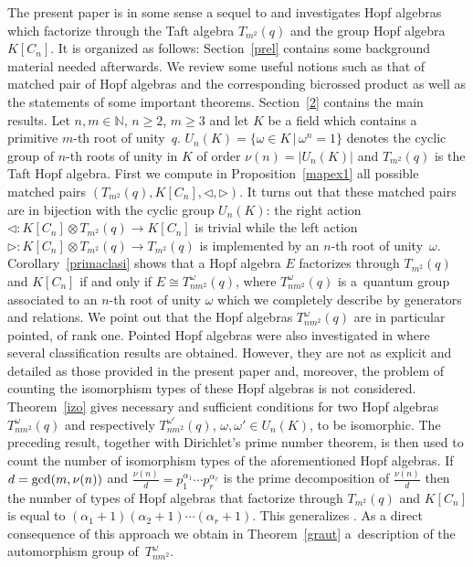\documentclass[pdftex]{sigma}
\numberwithin{equation}{section}
\begin{document}
The present paper is in some sense a sequel to \cite{abm} and investigates Hopf algebras which factorize through the Taft algebra $T_{m^{2}}(q)$ and the group Hopf algebra $K[C_{n}]$. It is organized as follows: Section~\ref{prel} contains some background material needed afterwards. We review some useful notions such as that of matched pair of Hopf algebras and the corresponding bicrossed product as well as the statements of some important theorems. Section~\ref{2} contains the main results. Let $n, m \in \mathbb{N}$, $n \geqslant 2$, $m \geqslant 3$ and let $K$ be a field
which contains a primitive $m$-th root of unity~$q$. $U_n (K) = \{\omega \in K \,|\, \omega^n = 1 \}$ denotes the cyclic group of $n$-th roots of unity in $K$ of order $\nu (n) = |U_n (K)|$ and $T_{m^{2}}(q)$ is the Taft Hopf algebra. First we compute in Proposition~\ref{mapex1} all possible matched pairs $(T_{m^{2}}(q), K[C_n], \triangleleft, \triangleright)$. It turns out that these matched pairs are in bijection with the cyclic group $U_n (K)$: the right action $\triangleleft \colon K[C_{n}] \otimes T_{m^{2}}(q) \to K[C_{n}]$ is trivial while the left action $\triangleright \colon K[C_{n}] \otimes T_{m^{2}}(q) \to T_{m^{2}}(q)$ is implemented by an $n$-th root of unity~$\omega$. Corollary~\ref{primaclasi} shows that a Hopf algebra $E$ factorizes through $T_{m^{2}}(q)$ and $K[C_n]$ if and only if $E \cong T_{nm^{2}}^ {\omega}(q)$, where $T_{nm^{2}}^ {\omega}(q)$ is a~quantum group associated to an $n$-th root of unity $\omega$ which we completely describe by generators and relations. We point out that the Hopf algebras $T_{nm^{2}}^ {\omega}(q)$ are in particular pointed, of rank one. Pointed Hopf algebras were also investigated in \cite{K,S,W} where several classification results are obtained. However, they are not as explicit and detailed as those provided in the present paper and, moreover, the problem of counting the isomorphism types of these Hopf algebras is not considered. Theorem~\ref{izo} gives necessary and sufficient conditions for two Hopf algebras $T_{nm^{2}}^ {\omega}(q)$ and respectively $T_{nm^{2}}^ {\omega'}(q)$, $\omega, \omega ' \in U_n (K)$, to be isomorphic. The
preceding result, together with Dirichlet's prime number theorem, is then used to count the number of isomorphism types of the aforementioned
Hopf algebras. If $d = {\rm gcd}(m, \nu (n))$ and $\frac{\nu(n)}{d} = p_1^{\alpha_1} \cdots p_r^{\alpha_r}$ is the prime decomposition of
$ \frac{\nu(n)}{d}$ then the number of types of Hopf algebras that factorize through $T_{m^{2}}(q)$ and $K[C_n]$ is equal to $(\alpha_1 + 1)(\alpha_2 + 1) \cdots (\alpha_r + 1)$. This generalizes \cite[Theorem~5.10]{abm}. As a direct consequence of this approach we obtain in Theorem~\ref{graut} a~description of the automorphism group of~$T_{nm^{2}}^ {\omega}$.
\end{document}
